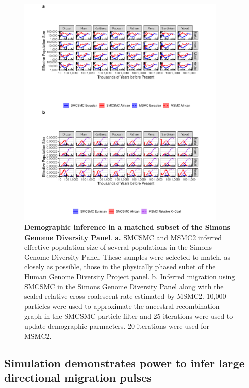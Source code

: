 \begin{figure}
  \centering
  \includegraphics[width=0.9\textwidth]{plot/subset_ne_mig.pdf}
  \caption[Demographic inference in a matched subset of the SGDP]{ {\bf Demographic inference in a matched subset of the Simons Genome Diversity Panel}. {\bf a.} SMCSMC and MSMC2 inferred effective population size of several populations in the Simons Genome Diversity Panel. These samples were selected to match, as closely as possible, those in the physically phased subet of the Human Genome Diversity Project panel. {b.} Inferred migration using SMCSMC in the Simons Genome Diversity Panel along with the scaled relative cross-coalescent rate estimated by MSMC2.  10,000 particles were used to approximate the ancestral recombination graph in the SMCSMC particle filter and 25 iterations were used to update demographic parmaeters. 20 iterations were used for MSMC2.}
  \label{fig:hgdp_sgdp}
\end{figure}

\subsection{Simulation demonstrates power to infer large directional migration pulses}

